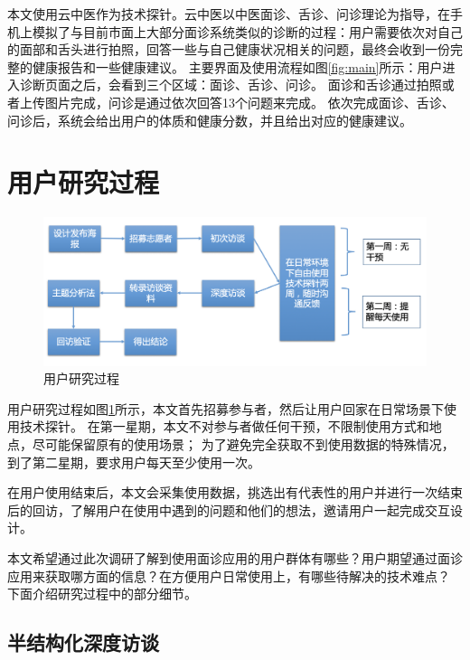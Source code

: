 本文使用云中医作为技术探针。云中医以中医面诊、舌诊、问诊理论为指导，在手机上模拟了与目前市面上大部分面诊系统类似的诊断的过程：用户需要依次对自己的面部和舌头进行拍照，回答一些与自己健康状况相关的问题，最终会收到一份完整的健康报告和一些健康建议。
主要界面及使用流程如图\ref{fig:main}所示：用户进入诊断页面之后，会看到三个区域：面诊、舌诊、问诊。
面诊和舌诊通过拍照或者上传图片完成，问诊是通过依次回答13个问题来完成。
依次完成面诊、舌诊、问诊后，系统会给出用户的体质和健康分数，并且给出对应的健康建议。

\section{用户研究过程}


\begin{figure}[h]
    \centering
    \includegraphics[width=15cm]{images/user_study_process.png}
    \caption{用户研究过程}
    \label{fig:user_study_process}
\end{figure}

用户研究过程如图\ref{fig:user_study_process}所示，本文首先招募参与者，然后让用户回家在日常场景下使用技术探针。
在第一星期，本文不对参与者做任何干预，不限制使用方式和地点，尽可能保留原有的使用场景；
为了避免完全获取不到使用数据的特殊情况，到了第二星期，要求用户每天至少使用一次。

在用户使用结束后，本文会采集使用数据，挑选出有代表性的用户并进行一次结束后的回访，了解用户在使用中遇到的问题和他们的想法，邀请用户一起完成交互设计。

本文希望通过此次调研了解到使用面诊应用的用户群体有哪些？用户期望通过面诊应用来获取哪方面的信息？在方便用户日常使用上，有哪些待解决的技术难点？
下面介绍研究过程中的部分细节。

\subsection{半结构化深度访谈}


